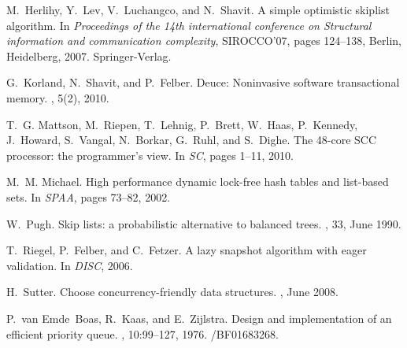 \begin{thebibliography}{99}
{%


M.~Herlihy, Y.~Lev, V.~Luchangco, and N.~Shavit.
\newblock A simple optimistic skiplist algorithm.
\newblock In {\em Proceedings of the 14th international conference on
  Structural information and communication complexity}, SIROCCO'07, pages
  124--138, Berlin, Heidelberg, 2007. Springer-Verlag.







G.~Korland, N.~Shavit, and P.~Felber.
\newblock Deuce: Noninvasive software transactional memory.
, 5(2), 2010.



T.~G. Mattson, M.~Riepen, T.~Lehnig, P.~Brett, W.~Haas, P.~Kennedy, J.~Howard,
  S.~Vangal, N.~Borkar, G.~Ruhl, and S.~Dighe.
\newblock The 48-core {SCC} processor: the programmer's view.
\newblock In {\em SC}, pages 1--11, 2010.

M.~M. Michael.
\newblock High performance dynamic lock-free hash tables and list-based sets.
\newblock In {\em SPAA}, pages 73--82, 2002.







W.~Pugh.
\newblock Skip lists: a probabilistic alternative to balanced trees.
, 33, June 1990.




T.~Riegel, P.~Felber, and C.~Fetzer.
\newblock A lazy snapshot algorithm with eager validation.
\newblock In {\em DISC}, 2006.



H.~Sutter.
\newblock Choose concurrency-friendly data structures.
, June 2008.

P.~van Emde~Boas, R.~Kaas, and E.~Zijlstra.
\newblock Design and implementation of an efficient priority queue.
, 10:99--127, 1976.
/BF01683268.

}
\end{thebibliography}
